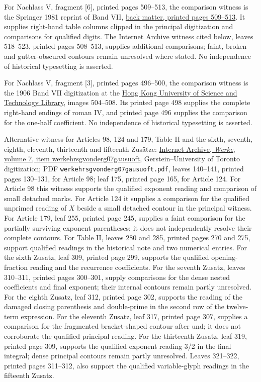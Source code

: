 For Nachlass V, fragment [6], printed pages 509–513, the comparison witness is the Springer 1981 reprint of Band VII, \href{https://link.springer.com/content/pdf/bbm:978-3-642-92478-1/1}{back matter, printed pages 509–513}. It supplies right-hand table columns clipped in the principal digitization and comparisons for qualified digits. The Internet Archive witness cited below, leaves 518–523, printed pages 508–513, supplies additional comparisons; faint, broken and gutter-obscured contours remain unresolved where stated. No independence of historical typesetting is asserted.



For Nachlass V, fragment [3], printed pages 496–500, the comparison witness is the 1906 Band VII digitization at the \href{https://lbezone.hkust.edu.hk/bib/b761099}{Hong Kong University of Science and Technology Library}, images 504–508. Its printed page 498 supplies the complete right-hand endings of roman IV, and printed page 496 supplies the comparison for the one-half coefficient. No independence of historical typesetting is asserted.

Alternative witness for Articles 98, 124 and 179, Table II and the sixth, seventh, eighth, eleventh, thirteenth and fifteenth Zusätze: \href{https://archive.org/details/werkehrsgvonderg07gausuoft}{Internet Archive, \emph{Werke}, volume 7, item werkehrsgvonderg07gausuoft}, Gerstein--University of Toronto digitization; PDF \texttt{werkehrsgvonderg07gausuoft.pdf}, leaves 140--141, printed pages 130--131, for Article 98; leaf 175, printed page 165, for Article 124. For Article 98 this witness supports the qualified exponent reading and comparison of small detached marks. For Article 124 it supplies a comparison for the qualified unprimed reading of \(X\) beside a small detached contour in the principal witness. For Article 179, leaf 255, printed page 245, supplies a faint comparison for the partially surviving exponent parentheses; it does not independently resolve their complete contours. For Table II, leaves 280 and 285, printed pages 270 and 275, support qualified readings in the historical note and two numerical entries. For the sixth Zusatz, leaf 309, printed page 299, supports the qualified opening-fraction reading and the recurrence coefficients. For the seventh Zusatz, leaves 310--311, printed pages 300--301, supply comparisons for the dense nested coefficients and final exponent; their internal contours remain partly unresolved. For the eighth Zusatz, leaf 312, printed page 302, supports the reading of the damaged closing parenthesis and double-prime in the second row of the twelve-term expression. For the eleventh Zusatz, leaf 317, printed page 307, supplies a comparison for the fragmented bracket-shaped contour after und; it does not corroborate the qualified principal reading. For the thirteenth Zusatz, leaf 319, printed page 309, supports the qualified exponent reading 3/2 in the final integral; dense principal contours remain partly unresolved. Leaves 321–322, printed pages 311–312, also support the qualified variable-glyph readings in the fifteenth Zusatz.

